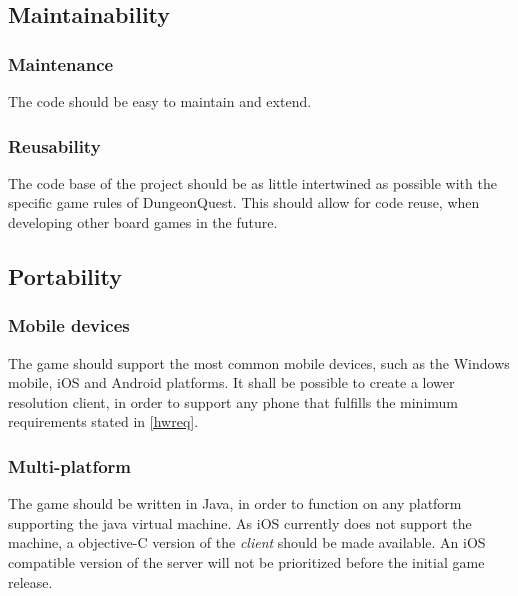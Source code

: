 
\subsection{Maintainability}
\subsubsection{Maintenance}
The code should be easy to maintain and extend.



\subsubsection{Reusability}
The code base of the project should be as little intertwined as possible with the specific game rules of DungeonQuest. This should allow for code reuse, when developing other board games in the future.


\subsection{Portability}
\subsubsection{Mobile devices}
The game should support the most common mobile devices, such as the Windows mobile, iOS and Android platforms. It shall be possible to create a lower resolution client, in order to support any phone that fulfills the minimum requirements stated in \ref{hwreq}.


\subsubsection{Multi-platform}
The game should be written in Java, in order to function on any platform supporting the java virtual machine. As iOS currently does not support the machine, a objective-C version of the \emph{client} should be made available. An iOS compatible version of the server will not be prioritized before the initial game release.

